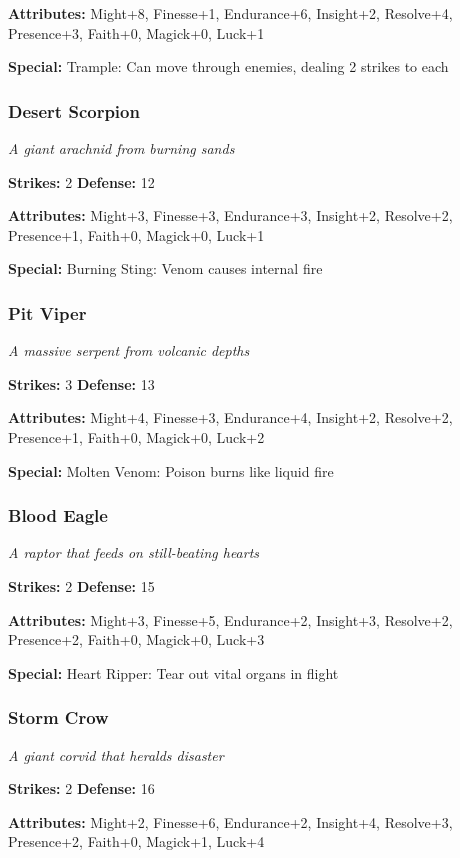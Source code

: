 \documentclass[10pt,twoside]{article}
\begin{document}
\textbf{Attributes:} Might+8, Finesse+1, Endurance+6, Insight+2, Resolve+4, Presence+3, Faith+0, Magick+0, Luck+1

\textbf{Special:} Trample: Can move through enemies, dealing 2 strikes to each

\subsubsection{Desert Scorpion}
\textit{A giant arachnid from burning sands}

\textbf{Strikes:} 2 \quad \textbf{Defense:} 12

\textbf{Attributes:} Might+3, Finesse+3, Endurance+3, Insight+2, Resolve+2, Presence+1, Faith+0, Magick+0, Luck+1

\textbf{Special:} Burning Sting: Venom causes internal fire

\subsubsection{Pit Viper}
\textit{A massive serpent from volcanic depths}

\textbf{Strikes:} 3 \quad \textbf{Defense:} 13

\textbf{Attributes:} Might+4, Finesse+3, Endurance+4, Insight+2, Resolve+2, Presence+1, Faith+0, Magick+0, Luck+2

\textbf{Special:} Molten Venom: Poison burns like liquid fire

\subsubsection{Blood Eagle}
\textit{A raptor that feeds on still-beating hearts}

\textbf{Strikes:} 2 \quad \textbf{Defense:} 15

\textbf{Attributes:} Might+3, Finesse+5, Endurance+2, Insight+3, Resolve+2, Presence+2, Faith+0, Magick+0, Luck+3

\textbf{Special:} Heart Ripper: Tear out vital organs in flight

\subsubsection{Storm Crow}
\textit{A giant corvid that heralds disaster}

\textbf{Strikes:} 2 \quad \textbf{Defense:} 16

\textbf{Attributes:} Might+2, Finesse+6, Endurance+2, Insight+4, Resolve+3, Presence+2, Faith+0, Magick+1, Luck+4
\end{document}
